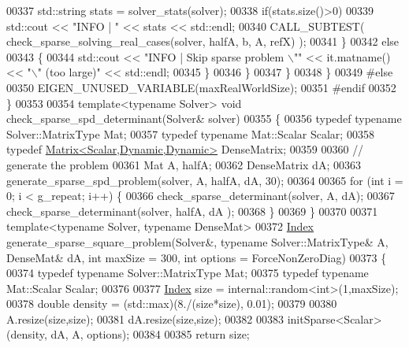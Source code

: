 \begin{DoxyCode}
00337           std::string stats = solver\_stats(solver);
00338           \textcolor{keywordflow}{if}(stats.size()>0)
00339             std::cout << \textcolor{stringliteral}{"INFO |  "} << stats << std::endl;
00340           CALL\_SUBTEST( check\_sparse\_solving\_real\_cases(solver, halfA, b, A, refX) );
00341         \}
00342         \textcolor{keywordflow}{else}
00343         \{
00344           std::cout << \textcolor{stringliteral}{"INFO | Skip sparse problem \(\backslash\)""} << it.matname() << \textcolor{stringliteral}{"\(\backslash\)" (too large)"} << std::endl;
00345         \}
00346       \}
00347     \}
00348   \}
00349 \textcolor{preprocessor}{#else}
00350   EIGEN\_UNUSED\_VARIABLE(maxRealWorldSize);
00351 \textcolor{preprocessor}{#endif}
00352 \}
00353 
00354 \textcolor{keyword}{template}<\textcolor{keyword}{typename} Solver> \textcolor{keywordtype}{void} check\_sparse\_spd\_determinant(Solver& solver)
00355 \{
00356   \textcolor{keyword}{typedef} \textcolor{keyword}{typename} Solver::MatrixType Mat;
00357   \textcolor{keyword}{typedef} \textcolor{keyword}{typename} Mat::Scalar Scalar;
00358   \textcolor{keyword}{typedef} \hyperlink{group___core___module}{Matrix<Scalar,Dynamic,Dynamic>} DenseMatrix;
00359 
00360   \textcolor{comment}{// generate the problem}
00361   Mat A, halfA;
00362   DenseMatrix dA;
00363   generate\_sparse\_spd\_problem(solver, A, halfA, dA, 30);
00364   
00365   \textcolor{keywordflow}{for} (\textcolor{keywordtype}{int} i = 0; i < g\_repeat; i++) \{
00366     check\_sparse\_determinant(solver, A,     dA);
00367     check\_sparse\_determinant(solver, halfA, dA );
00368   \}
00369 \}
00370 
00371 \textcolor{keyword}{template}<\textcolor{keyword}{typename} Solver, \textcolor{keyword}{typename} DenseMat>
00372 \hyperlink{namespace_eigen_a62e77e0933482dafde8fe197d9a2cfde}{Index} generate\_sparse\_square\_problem(Solver&, \textcolor{keyword}{typename} Solver::MatrixType& A, DenseMat& dA, \textcolor{keywordtype}{int} 
      maxSize = 300, \textcolor{keywordtype}{int} options = ForceNonZeroDiag)
00373 \{
00374   \textcolor{keyword}{typedef} \textcolor{keyword}{typename} Solver::MatrixType Mat;
00375   \textcolor{keyword}{typedef} \textcolor{keyword}{typename} Mat::Scalar Scalar;
00376 
00377   \hyperlink{namespace_eigen_a62e77e0933482dafde8fe197d9a2cfde}{Index} size = internal::random<int>(1,maxSize);
00378   \textcolor{keywordtype}{double} density = (std::max)(8./(size*size), 0.01);
00379   
00380   A.resize(size,size);
00381   dA.resize(size,size);
00382 
00383   initSparse<Scalar>(density, dA, A, options);
00384   
00385   \textcolor{keywordflow}{return} size;

\end{DoxyCode}

